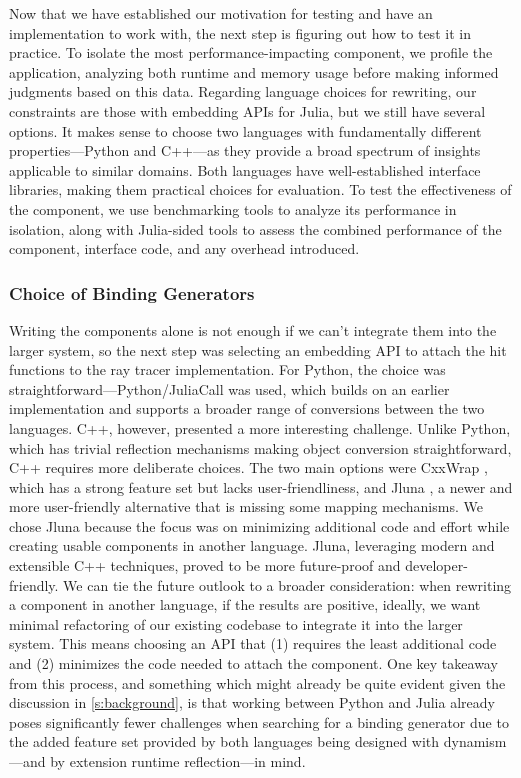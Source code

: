 Now that we have established our motivation for testing and have an implementation to work with, the next step is figuring out how to test it in practice. To isolate the most performance-impacting component, we profile the application, analyzing both runtime and memory usage before making informed judgments based on this data. Regarding language choices for rewriting, our constraints are those with embedding APIs for Julia, but we still have several options. It makes sense to choose two languages with fundamentally different properties—Python and C++—as they provide a broad spectrum of insights applicable to similar domains. Both languages have well-established interface libraries, making them practical choices for evaluation. To test the effectiveness of the component, we use benchmarking tools to analyze its performance in isolation, along with Julia-sided tools to assess the combined performance of the component, interface code, and any overhead introduced.

\subsubsection{Choice of Binding Generators}

Writing the components alone is not enough if we can't integrate them into the larger system, so the next step was selecting an embedding API to attach the hit functions to the ray tracer implementation. For Python, the choice was straightforward—Python/JuliaCall \cite{Rowley2025JuliaPy} was used, which builds on an earlier implementation and supports a broader range of conversions between the two languages. C++, however, presented a more interesting challenge. Unlike Python, which has trivial reflection mechanisms making object conversion straightforward, C++ requires more deliberate choices. The two main options were CxxWrap \cite{Janssens2025JuliaInterop}, which has a strong feature set but lacks user-friendliness, and Jluna \cite{jluna}, a newer and more user-friendly alternative that is missing some mapping mechanisms. We chose Jluna because the focus was on minimizing additional code and effort while creating usable components in another language. Jluna, leveraging modern and extensible C++ techniques, proved to be more future-proof and developer-friendly. We can tie the future outlook to a broader consideration: when rewriting a component in another language, if the results are positive, ideally, we want minimal refactoring of our existing codebase to integrate it into the larger system. This means choosing an API that (1) requires the least additional code and (2) minimizes the code needed to attach the component. One key takeaway from this process, and something which might already be quite evident given the discussion in \ref{s:background}, is that working between Python and Julia already poses significantly fewer challenges when searching for a binding generator due to the added feature set provided by both languages being designed with dynamism—and by extension runtime reflection—in mind.


